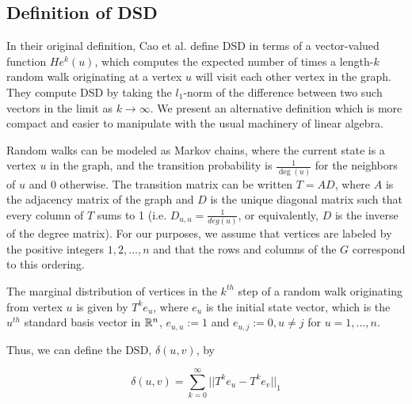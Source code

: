 \subsection*{Definition of DSD}

\noindent In their original definition, Cao et al. define DSD in terms of a
vector-valued function $He^{k}(u)$, which computes the expected number of times
a length-$k$ random walk originating at a vertex $u$ will visit each other vertex
in the graph. They compute DSD by taking the $l_1$-norm of the difference
between two such vectors in the limit as $k \to \infty$. We present an
alternative definition which is more compact and easier to manipulate with the
usual machinery of linear algebra.

Random walks can be modeled as Markov chains, where the current state is a
vertex $u$ in the graph, and the transition probability is $\frac{1}{\deg(u)}$
for the neighbors of $u$ and $0$ otherwise. The transition matrix can be written
$T = AD$, where $A$ is the adjacency matrix of the graph and $D$ is the unique
diagonal matrix such that every column of $T$ sums to 1 (i.e.
$D_{u,u}=\frac{1}{deg(u)}$, or equivalently, $D$ is the inverse of the degree
matrix). For our purposes, we assume that vertices are labeled by the positive
integers $1,2,...,n$ and that the rows and columns of the $G$ correspond to this
ordering.

The marginal distribution of vertices in the $k^{th}$ step of a random walk
originating from vertex $u$ is given by $T^ke_u$, where $e_u$ is the initial
state vector, which is the $u^{th}$ standard basis vector in $\mathbb{R}^n$,
$e_{u,u} := 1$ and $e_{u,j} := 0, u \neq j$ for $u=1,...,n$.

Thus, we can define the DSD, $\delta(u,v)$, by

\[
  \delta(u,v) = \sum_{k =0}^{\infty}{||T^ke_u - T^ke_v||_1}
\]

